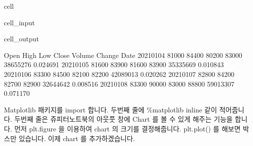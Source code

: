 \documentclass[letterpaper,10pt,english]{jupyterBook}
\begin{document}
\begin{sphinxuseclass}{cell}\begin{sphinxVerbatimInput}

\begin{sphinxuseclass}{cell_input}
\begin{sphinxVerbatim}[commandchars=\\\{\}]
    
   

   
     

\end{sphinxVerbatim}

\end{sphinxuseclass}\end{sphinxVerbatimInput}
\begin{sphinxVerbatimOutput}

\begin{sphinxuseclass}{cell_output}
\begin{sphinxVerbatim}[commandchars=\\\{\}]
             Open   High    Low  Close    Volume    Change
Date                                                      
2021\PYGZhy{}01\PYGZhy{}04  81000  84400  80200  83000  38655276  0.024691
2021\PYGZhy{}01\PYGZhy{}05  81600  83900  81600  83900  35335669  0.010843
2021\PYGZhy{}01\PYGZhy{}06  83300  84500  82100  82200  42089013 \PYGZhy{}0.020262
2021\PYGZhy{}01\PYGZhy{}07  82800  84200  82700  82900  32644642  0.008516
2021\PYGZhy{}01\PYGZhy{}08  83300  90000  83000  88800  59013307  0.071170
\end{sphinxVerbatim}

\end{sphinxuseclass}\end{sphinxVerbatimOutput}

\end{sphinxuseclass}
\sphinxAtStartPar
 Matplotlib 패키지를 import 합니다. 두번째 줄에 \%matplotlib inline 같이 적어줍니다. 두번째 줄은 쥬피터노트북의 아웃풋 창에 Chart 를 볼 수 있게 해주는 기능을 합니다. 먼저 plt.figure 을 이용하여 chart 의 크기를 결정해줍니다. plt.plot() 를 해보면 박스만 있습니다. 이제 chart 를 추가하겠습니다.
\end{document}
